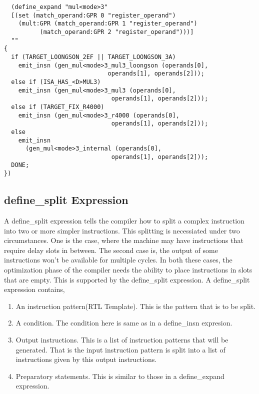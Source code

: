 \begin{example}
\onehalfspacing
 \begin{verbatim}
  (define_expand "mul<mode>3"
  [(set (match_operand:GPR 0 "register_operand")
	(mult:GPR (match_operand:GPR 1 "register_operand")
		  (match_operand:GPR 2 "register_operand")))]
  ""
{
  if (TARGET_LOONGSON_2EF || TARGET_LOONGSON_3A)
    emit_insn (gen_mul<mode>3_mul3_loongson (operands[0], 
                             operands[1], operands[2]));
  else if (ISA_HAS_<D>MUL3)
    emit_insn (gen_mul<mode>3_mul3 (operands[0], 
                              operands[1], operands[2]));
  else if (TARGET_FIX_R4000)
    emit_insn (gen_mul<mode>3_r4000 (operands[0], 
                              operands[1], operands[2]));
  else
    emit_insn
      (gen_mul<mode>3_internal (operands[0], 
                              operands[1], operands[2]));
  DONE;
})
 \end{verbatim}

\end{example}


\subsection{define\_split Expression}
A define\_split expression tells the compiler how to split a complex instruction into two or more simpler instructions. This splitting is necessiated
under two circumstances. One is the case, where the machine may have instructions that require delay slots in between. The second case is,
the output of some instructions won't be available for multiple cycles. In both these cases, the optimization phase of the compiler needs the ability
to place instructions in slots that are empty. This is supported by the define\_split expression. A define\_split expression contains,

\begin{enumerate}
 \item An instruction pattern(RTL Template). This is the pattern that is to be split.
 \item A condition. The condition here is same as in a define\_insn expresion.
 \item Output instructions. This is a list of instruction patterns that will be generated. That is the input instruction pattern is split into a list
 of instructions given by this output instructions.
 \item Preparatory statements. This is similar to those in a define\_expand expression. 
\end{enumerate}



